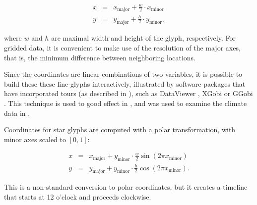 \documentclass[oneside]{article}
\newcommand\amin{\text{minor}}
\newcommand\amaj{\text{major}}
\begin{document}
\begin{equation}
  \begin{array}{lll}
  x &=& x_{\amaj} + \frac{w}{2} \cdot x_{\amin}\\
  y &=& y_{\amaj} + \frac{h}{2} \cdot y_{\amin}, 
  \end{array}
  \label{coords.eqn}
\end{equation}

\noindent where $w$ and $h$ are maximal width and height of the glyph, respectively. For gridded data, it is convenient to make use of the resolution of the major axes, that is, the minimum difference between neighboring locations. 

Since the coordinates are linear combinations of two variables, it is possible to build these these line-glyphs interactively, illustrated by software packages that have incorporated tours (as described in \citet{cook:2006}), such as DataViewer \citep{buja:1986}, XGobi \citep{swayne:1991} or GGobi \citep{swayne:2003}. This technique is used to good effect in \citet{buja:1996a}, and was used to examine the climate data in \citet{hobbs:2010}.

Coordinates for star glyphs are computed with a polar transformation, with minor axes scaled to $[0, 1]$: 

\begin{equation}
  \begin{array}{lll}
  x &=& x_{\amaj} + y_{\amin} \cdot \frac{w}{2} \sin(2 \pi x_{\amin}) \\
  y &=& y_{\amaj} + y_{\amin} \cdot \frac{h}{2} \cos(2 \pi x_{\amin}).
  \end{array}
  \label{coords.polar.eqn}
\end{equation}

\noindent This is a non-standard conversion to polar coordinates, but it creates a timeline that starts at 12 o'clock and proceeds clockwise.

%
% 
% 
%     
%   
\end{document}
